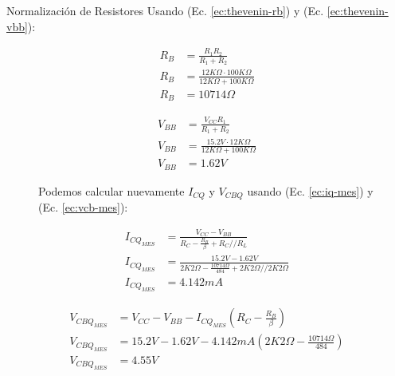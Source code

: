 \begin{frame}[allowframebreaks]{Normalización de Resistores}
  Usando (Ec. \ref{ec:thevenin-rb}) y (Ec. \ref{ec:thevenin-vbb}):
  \begin{figure}[!ht]
    \begin{minipage}{0.45\textwidth}
      \begin{align*}
        R_B &= \frac{R_1 R_2}{R_1 + R_2}\\[6pt]
        R_B &= \frac{12K\Omega \cdot 100K\Omega}{12K\Omega + 100K\Omega}\\[6pt]
        R_B &= 10714\Omega
      \end{align*}
    \end{minipage}
    \hfill
    \begin{minipage}{0.45\textwidth}
      \begin{align*}
        V_{BB} &= \frac{V_{CC} R_1}{R_1 + R_2}\\[6pt]
        V_{BB} &= \frac{15.2V \cdot 12K\Omega}{12K\Omega + 100K\Omega}\\[6pt]
        V_{BB} &= 1.62V
      \end{align*}
    \end{minipage}
  \end{figure}
  \begin{figure}[!ht]
    Podemos calcular nuevamente $I_{CQ}$ y $V_{CBQ}$ usando (Ec. \ref{ec:iq-mes}) y (Ec. \ref{ec:vcb-mes}):
    \small
    \begin{minipage}{0.45\textwidth}
      \begin{align*}
        I_{CQ_{MES}} &= \frac{V_{CC} - V_{BB}}{R_C - \frac{R_B}{\beta} + R_C // R_L}\\[6pt]
        I_{CQ_{MES}} &= \frac{15.2V - 1.62V}{2K2\Omega - \frac{10714\Omega}{484} + 2K2\Omega // 2K2\Omega}\\[6pt]
        I_{CQ_{MES}} &= 4.142mA
      \end{align*}
    \end{minipage}
    \hfill
    \begin{minipage}{0.45\textwidth}
      \begin{align*}
        V_{CBQ_{MES}} &= V_{CC} - V_{BB} - I_{CQ_{MES}} \left(R_C - \frac{R_B}{\beta}\right)\\[6pt]
        V_{CBQ_{MES}} &= 15.2V - 1.62V - 4.142mA \left(2K2\Omega - \frac{10714\Omega}{484}\right)\\[6pt]
        V_{CBQ_{MES}} &= 4.55V
      \end{align*}
    \end{minipage}
  \end{figure}


\end{frame}
